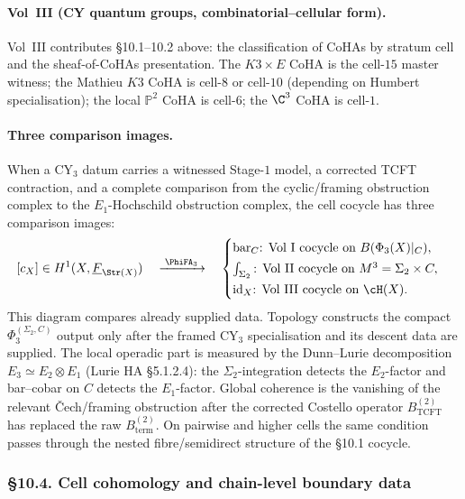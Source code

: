 \paragraph{Vol~III (CY quantum groups, combinatorial--cellular form).}
Vol~III contributes \S 10.1--10.2 above: the classification of CoHAs
by stratum cell and the sheaf-of-CoHAs presentation. The $K3\times E$
CoHA is the cell-$15$ master witness; the Mathieu $K3$ CoHA is
cell-$8$ or cell-$10$ (depending on Humbert specialisation); the
local $\mathbb{P}^{2}$ CoHA is cell-$6$; the $\C^{3}$ CoHA is
cell-$1$.

\paragraph{Three comparison images.} When a CY$_3$ datum carries a
witnessed Stage-$1$ model, a corrected TCFT contraction, and a complete
comparison from the cyclic/framing obstruction complex to the
\(E_1\)-Hochschild obstruction complex, the cell cocycle has three
comparison images:
\[
[c_{X}]\in H^{1}(X,\underline{F}_{\Str(X)})
\quad\xrightarrow{\;\PhiFA_{3}\;}\quad
\begin{cases}
\text{bar}_{C}\text{: Vol~I cocycle on }B(\Phi_{3}(X)|_{C}),\\[0.5ex]
\int_{\Sigma_{2}}\text{: Vol~II cocycle on }M^{3}=\Sigma_{2}\times C,\\[0.5ex]
\mathrm{id}_{X}\text{: Vol~III cocycle on }\cH(X).
\end{cases}
\]
This diagram compares already supplied data. Topology constructs the
compact \(\Phi_3^{(\Sigma_2, C)}\) output only after the framed
CY$_3$ specialisation and its descent data are supplied. The local
operadic part is measured by the Dunn--Lurie decomposition
$E_{3}\simeq E_{2}\otimes E_{1}$ (Lurie HA \S 5.1.2.4): the
$\Sigma_{2}$-integration detects the $E_{2}$-factor and bar--cobar on
$C$ detects the $E_{1}$-factor. Global coherence is the vanishing of
the relevant \v{C}ech/framing obstruction after the corrected Costello
operator \(B_{\mathrm{TCFT}}^{(2)}\) has replaced the raw
\(B_{\mathrm{term}}^{(2)}\). On pairwise and higher cells the same
condition passes through the nested fibre/semidirect structure of the
\S 10.1 cocycle.

\subsubsection{\S 10.4. Cell cohomology and chain-level boundary data}
\label{gluing:sec:10-4-cell-cohomology}

